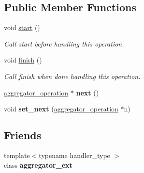 \subsection*{Public Member Functions}
\begin{DoxyCompactItemize}
\item 
\hypertarget{classtbb_1_1interface6_1_1aggregator__operation_adc0e032aa604f1da85ffc7ec269b157f}{}void \hyperlink{classtbb_1_1interface6_1_1aggregator__operation_adc0e032aa604f1da85ffc7ec269b157f}{start} ()\label{classtbb_1_1interface6_1_1aggregator__operation_adc0e032aa604f1da85ffc7ec269b157f}

\begin{DoxyCompactList}\small\item\em Call start before handling this operation. \end{DoxyCompactList}\item 
void \hyperlink{classtbb_1_1interface6_1_1aggregator__operation_ac7edadfe74f475783f3b429904e7010a}{finish} ()
\begin{DoxyCompactList}\small\item\em Call finish when done handling this operation. \end{DoxyCompactList}\item 
\hypertarget{classtbb_1_1interface6_1_1aggregator__operation_acbce3d13545770501b54df153bf1e690}{}\hyperlink{classtbb_1_1interface6_1_1aggregator__operation}{aggregator\+\_\+operation} $\ast$ {\bfseries next} ()\label{classtbb_1_1interface6_1_1aggregator__operation_acbce3d13545770501b54df153bf1e690}

\item 
\hypertarget{classtbb_1_1interface6_1_1aggregator__operation_a03cf9fad0ca21da61b83325a50e17d0b}{}void {\bfseries set\+\_\+next} (\hyperlink{classtbb_1_1interface6_1_1aggregator__operation}{aggregator\+\_\+operation} $\ast$n)\label{classtbb_1_1interface6_1_1aggregator__operation_a03cf9fad0ca21da61b83325a50e17d0b}

\end{DoxyCompactItemize}
\subsection*{Friends}
\begin{DoxyCompactItemize}
\item 
\hypertarget{classtbb_1_1interface6_1_1aggregator__operation_a7f6e7d315f893b1b66d06ffdad12038e}{}{\footnotesize template$<$typename handler\+\_\+type $>$ }\\class {\bfseries aggregator\+\_\+ext}\label{classtbb_1_1interface6_1_1aggregator__operation_a7f6e7d315f893b1b66d06ffdad12038e}

\end{DoxyCompactItemize}


